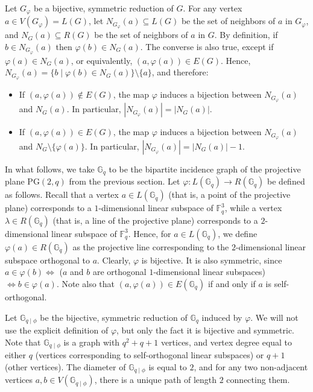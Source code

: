 \documentclass[a4paper,UKenglish,cleveref, autoref, thm-restate]{arxiv}
\newcommand{\G}[1][q]{\mathbb{G}_{#1}}
\newcommand{\Gphi}[1][q]{\mathbb{G}_{#1\mid\phi}}
\begin{document}
\medskip Let $G_\varphi$ be a bijective, symmetric reduction of $G$. For any vertex $a\in V(G_\varphi) = L(G)$, let $N_{G_\varphi}(a) \subseteq L(G)$ be the set of neighbors of $a$ in $G_\varphi$, and $N_{G}(a) \subseteq R(G)$ be the set of neighbors of $a$ in $G$. By definition, if $b\in N_{G_\varphi}(a)$ then $\varphi(b)\in N_{G}(a)$. The converse is also true, except if $\varphi(a)\in N_{G}(a)$, or equivalently, $(a,\varphi(a)) \in E(G)$. Hence, $N_{G_\varphi}(a)  = 
    \{b \mid  \varphi(b) \in N_{G}(a)\} \setminus \{a\}$, and therefore:
\begin{itemize}
    \item If $(a,\varphi(a)) \not\in E(G)$, the map $\varphi$ induces a bijection between $N_{G_\varphi}(a)$ and $N_{G}(a)$. In particular,  $|N_{G_\varphi}(a)| =  |N_{G}(a)|$.
    \item If $(a,\varphi(a)) \in E(G)$, the map  $\varphi$ induces a bijection between $N_{G_\varphi}(a)$ and $N_{G}\setminus \{\varphi(a)\}$. In particular, $|N_{G_\varphi}(a)| =  |N_{G}(a)|-1$.
\end{itemize}

In what follows, we take $\G$ to be the bipartite incidence graph of the projective plane $\mbox{PG}(2,q)$ from the previous section. Let $\varphi: L(\G) \rightarrow R(\G)$   be defined as follows. Recall that a vertex $a\in L(\G)$ (that is, a point of the projective plane) corresponds to a $1$-dimensional linear subspace of  $\mathbb{F}_q^3$, while a vertex $\lambda\in R(\G)$ (that is, a line of the projective plane) corresponds to a $2$-dimensional linear subspace of  $\mathbb{F}_q^3$. Hence, for $a\in L(\G)$, we define $\varphi(a) \in R(\G)$ as the projective line corresponding to the $2$-dimensional linear subspace orthogonal to $a$. Clearly, $\varphi$ is bijective. It is also symmetric, since $a\in \varphi(b) \Leftrightarrow$ ($a$ and $b$ are orthogonal $1$-dimensional linear subspaces) $\Leftrightarrow b\in \varphi(a)$. Note also that  $(a, \varphi(a))\in E(\G)$ if and only if  $a$ is self-orthogonal. 

Let $\Gphi$   be the bijective, symmetric reduction of $\G$ induced by $\varphi$. We will not use the explicit definition of $\varphi$, but only the fact it is bijective and symmetric. Note that $\Gphi$ is a graph with $q^2+q+1$ vertices, and vertex degree equal to either $q$ (vertices corresponding to self-orthogonal linear subspaces) or $q+1$ (other vertices). The diameter of $\Gphi$ is equal to $2$, and for any two non-adjacent vertices $a, b\in V(\Gphi)$, there is a unique path of length $2$ connecting them.
\end{document}
